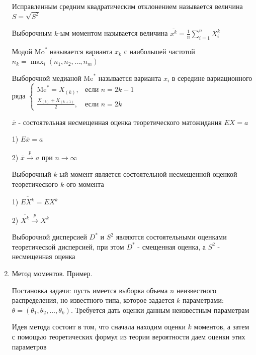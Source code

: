 \begin{enumerate}
    \Defs Исправленным средним квадратическим отклонением называется величина $S = \sqrt{S^2}$

    \Defs Выборочным $k$-ым моментом называется величина $\overline{x^k} = \frac{1}{n} \sum_{i = 1}^n X_i^k$

    \Defs Модой $\mathrm{Mo}^*$ называется варианта $x_k$ с наибольшей частотой $n_k = \max_i (n_1, n_2, \dots, n_m)$

    \Defs Выборочной медианой $\mathrm{Me}^*$ называется варианта $x_i$ в середине вариационного ряда $\begin{cases}\mathrm{Me}^* = 
    X_{(k)}, & \text{если } n = 2k - 1 \\ \frac{X_{(k)} + X_{(k + 1)}}{2}, & \text{если } n = 2k\end{cases}$
    
    \begin{MyTheorem}
        \Ths $\overline{x}$ - состоятельная несмещенная оценка теоретического матожидания $EX = a$
    
        1) $E \overline{x} = a$
    
        2) $\overline{x} \overset{p}{\longrightarrow} a$ при $n \to \infty$
    \end{MyTheorem}
    
    \begin{MyTheorem}
        \Ths Выборочный $k$-ый момент является состоятельной несмещенной оценкой теоретического $k$-ого момента
    
        1) $\overline{E X^k} = E X^k$
    
        2) $\overline{X^k} \overset{p}{\longrightarrow} X^k$
    \end{MyTheorem}
    
    \begin{MyTheorem}
        \Ths Выборочной дисперсией $D^*$ и $S^2$ являются состоятельными оценками теоретической дисперсией, при этом $D^*$ - смещенная оценка, а $S^2$ - несмещенная оценка
    \end{MyTheorem}

    \item Метод моментов. Пример.

    Постановка задачи: пусть имеется выборка объема $n$ неизвестного распределения, но известного типа,
    которое задается $k$ параметрами: $\theta = (\theta_1, \theta_2, \dots, \theta_k)$. Требуется дать оценки данным
    неизвестным параметрам

    Идея метода состоит в том, что сначала находим оценки $k$ моментов, а затем с помощью теоретических формул
    из теории вероятности даем оценки этих параметров


\end{enumerate}
